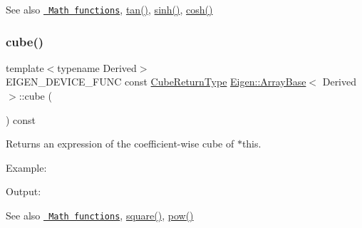 \begin{DoxySeeAlso}{See also}
\href{group__CoeffwiseMathFunctions.html\#cwisetable_cosh}{\texttt{ Math functions}}, \mbox{\hyperlink{class_eigen_1_1_array_base_acc502922cf9aeb43b07b30f250cd1d21}{tan()}}, \mbox{\hyperlink{class_eigen_1_1_array_base_a0984c5e3b76efa0c66a754ea7106f5b9}{sinh()}}, \mbox{\hyperlink{class_eigen_1_1_array_base_a5fd3dbcabcd2857db8f26ca5b321788f}{cosh()}} 
\end{DoxySeeAlso}
\mbox{\label{class_eigen_1_1_array_base_ab49fda99c455624b18410b9af0be71ec}} 
\subsubsection{\texorpdfstring{cube()}{cube()}}
{\footnotesize\ttfamily template$<$typename Derived$>$ \\
E\+I\+G\+E\+N\+\_\+\+D\+E\+V\+I\+C\+E\+\_\+\+F\+U\+NC const \mbox{\hyperlink{class_eigen_1_1_cwise_unary_op}{Cube\+Return\+Type}} \mbox{\hyperlink{class_eigen_1_1_array_base}{Eigen\+::\+Array\+Base}}$<$ Derived $>$\+::cube (\begin{DoxyParamCaption}{ }\end{DoxyParamCaption}) const\hspace{0.3cm}{\ttfamily [inline]}}

\begin{DoxyReturn}{Returns}
an expression of the coefficient-\/wise cube of $\ast$this.
\end{DoxyReturn}
Example\+: 
\begin{DoxyCodeInclude}{0}
\end{DoxyCodeInclude}
 Output\+: 
\begin{DoxyVerbInclude}
\end{DoxyVerbInclude}


\begin{DoxySeeAlso}{See also}
\href{group__CoeffwiseMathFunctions.html\#cwisetable_cube}{\texttt{ Math functions}}, \mbox{\hyperlink{class_eigen_1_1_array_base_a95c818b933d73944c53bf0226ea106c8}{square()}}, \mbox{\hyperlink{class_eigen_1_1_array_base_ab6dc101d82e8228a19a8840e3a29c1c9}{pow()}} 
\end{DoxySeeAlso}
\mbox{\label{class_eigen_1_1_array_base_a43bf848499e8562675e8c5881ac1ee97}} 
